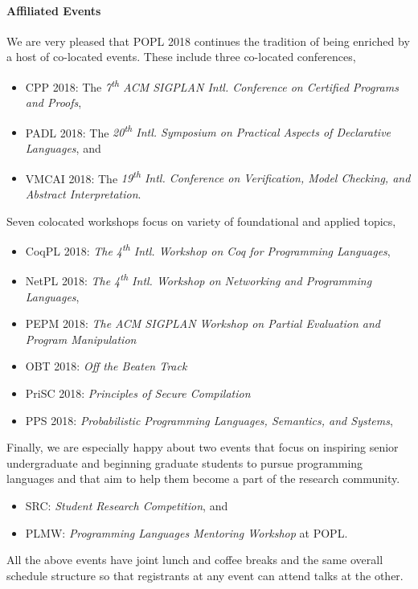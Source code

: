 \documentclass[11pt]{article}
\begin{document}
\paragraph{Affiliated Events}
%
We are very pleased that POPL 2018 continues the tradition of being enriched
by a host of co-located events.
%
These include three co-located conferences,
%
\begin{itemize}
  \item CPP 2018:   The \emph{7\textsuperscript{th} ACM SIGPLAN Intl. Conference on Certified Programs and Proofs},
  \item PADL 2018:  The \emph{20\textsuperscript{th} Intl. Symposium on Practical Aspects of Declarative Languages}, and
  \item VMCAI 2018: The \emph{19\textsuperscript{th} Intl. Conference on Verification, Model Checking, and Abstract Interpretation}.
\end{itemize}
%
Seven colocated workshops focus on variety of foundational and applied topics,
%
\begin{itemize}
  \item CoqPL 2018: \emph{The 4\textsuperscript{th} Intl. Workshop on Coq for Programming Languages},
  \item NetPL 2018: \emph{The 4\textsuperscript{th} Intl. Workshop on Networking and Programming Languages},
  \item PEPM 2018:  \emph{The ACM SIGPLAN Workshop on Partial Evaluation and Program Manipulation}
  \item OBT 2018:   \emph{Off the Beaten Track}
  \item PriSC 2018: \emph{Principles of Secure Compilation}
  \item PPS 2018:   \emph{Probabilistic Programming Languages, Semantics, and Systems},
\end{itemize}
%
Finally, we are especially happy about two events that
focus on inspiring senior undergraduate and beginning
graduate students to pursue programming languages and
that aim to help them become a part of the research
community.
%
\begin{itemize}
\item SRC: \emph{Student Research Competition}, and
\item PLMW: \emph{Programming Languages Mentoring Workshop} at POPL.
\end{itemize}
%
All the above events have joint lunch and coffee breaks
and the same overall schedule structure so that registrants
at any event can attend talks at the other.
\end{document}
